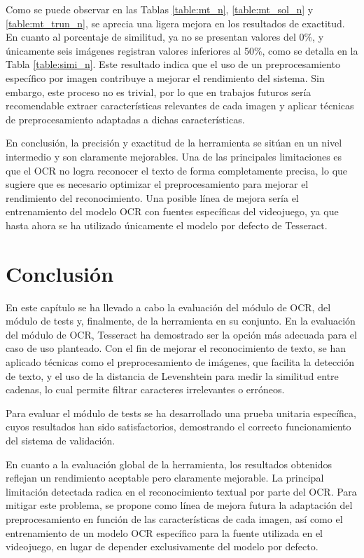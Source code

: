 Como se puede observar en las Tablas \ref{table:mt_n}, \ref{table:mt_sol_n} y \ref{table:mt_trun_n}, se aprecia una ligera mejora en los resultados de exactitud. En cuanto al porcentaje de similitud, ya no se presentan valores del 0\%, y únicamente seis imágenes registran valores inferiores al 50\%, como se detalla en la Tabla \ref{table:simi_n}. Este resultado indica que el uso de un preprocesamiento específico por imagen contribuye a mejorar el rendimiento del sistema. Sin embargo, este proceso no es trivial, por lo que en trabajos futuros sería recomendable extraer características relevantes de cada imagen y aplicar técnicas de preprocesamiento adaptadas a dichas características.

En conclusión, la precisión y exactitud de la herramienta se sitúan en un nivel intermedio y son claramente mejorables. Una de las principales limitaciones es que el OCR no logra reconocer el texto de forma completamente precisa, lo que sugiere que es necesario optimizar el preprocesamiento para mejorar el rendimiento del reconocimiento. Una posible línea de mejora sería el entrenamiento del modelo OCR con fuentes específicas del videojuego, ya que hasta ahora se ha utilizado únicamente el modelo por defecto de Tesseract.

\section{Conclusión}
En este capítulo se ha llevado a cabo la evaluación del módulo de OCR, del módulo de tests y, finalmente, de la herramienta en su conjunto. En la evaluación del módulo de OCR, Tesseract ha demostrado ser la opción más adecuada para el caso de uso planteado. Con el fin de mejorar el reconocimiento de texto, se han aplicado técnicas como el preprocesamiento de imágenes, que facilita la detección de texto, y el uso de la distancia de Levenshtein para medir la similitud entre cadenas, lo cual permite filtrar caracteres irrelevantes o erróneos.

Para evaluar el módulo de tests se ha desarrollado una prueba unitaria específica, cuyos resultados han sido satisfactorios, demostrando el correcto funcionamiento del sistema de validación.

En cuanto a la evaluación global de la herramienta, los resultados obtenidos reflejan un rendimiento aceptable pero claramente mejorable. La principal limitación detectada radica en el reconocimiento textual por parte del OCR. Para mitigar este problema, se propone como línea de mejora futura la adaptación del preprocesamiento en función de las características de cada imagen, así como el entrenamiento de un modelo OCR específico para la fuente utilizada en el videojuego, en lugar de depender exclusivamente del modelo por defecto.
